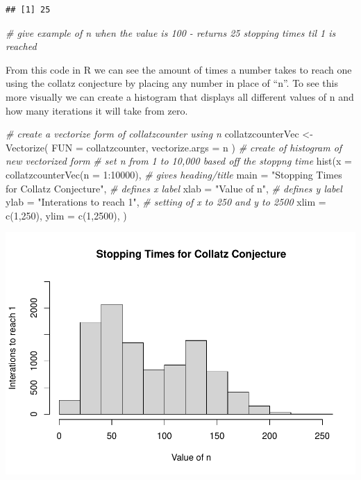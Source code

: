 \documentclass[
]{article}
\newenvironment{Shaded}{\begin{snugshade}}{\end{snugshade}}
\newcommand{\AttributeTok}[1]{\textcolor[rgb]{0.77,0.63,0.00}{#1}}
\newcommand{\CommentTok}[1]{\textcolor[rgb]{0.56,0.35,0.01}{\textit{#1}}}
\newcommand{\DecValTok}[1]{\textcolor[rgb]{0.00,0.00,0.81}{#1}}
\newcommand{\FunctionTok}[1]{\textcolor[rgb]{0.00,0.00,0.00}{#1}}
\newcommand{\NormalTok}[1]{#1}
\newcommand{\OtherTok}[1]{\textcolor[rgb]{0.56,0.35,0.01}{#1}}
\newcommand{\SpecialCharTok}[1]{\textcolor[rgb]{0.00,0.00,0.00}{#1}}
\newcommand{\StringTok}[1]{\textcolor[rgb]{0.31,0.60,0.02}{#1}}
\begin{document}
\begin{verbatim}
## [1] 25
\end{verbatim}

\begin{Shaded}
\begin{Highlighting}[]
\CommentTok{\# give example of n when the value is 100 {-} returns 25 stopping times til 1 is reached }
\end{Highlighting}
\end{Shaded}

From this code in R we can see the amount of times a number takes to
reach one using the collatz conjecture by placing any number in place of
``n''. To see this more visually we can create a histogram that displays
all different values of n and how many iterations it will take from
zero.

\begin{Shaded}
\begin{Highlighting}[]
\CommentTok{\# create a vectorize form of collatzcounter using \textquotesingle{}n\textquotesingle{}}
\NormalTok{collatzcounterVec }\OtherTok{\textless{}{-}} \FunctionTok{Vectorize}\NormalTok{(}
  \AttributeTok{FUN =}\NormalTok{ collatzcounter,}
  \AttributeTok{vectorize.args =} \StringTok{\textquotesingle{}n\textquotesingle{}}
\NormalTok{)}
\CommentTok{\# create of histogram of new vectorized form}
\CommentTok{\# set n from 1 to 10,000 based off the stoppng time}
\FunctionTok{hist}\NormalTok{(}\AttributeTok{x =} \FunctionTok{collatzcounterVec}\NormalTok{(}\AttributeTok{n =} \DecValTok{1}\SpecialCharTok{:}\DecValTok{10000}\NormalTok{),}
     \CommentTok{\# gives heading/title}
    \AttributeTok{main =} \StringTok{"Stopping Times for Collatz Conjecture"}\NormalTok{,}
    \CommentTok{\# defines x label}
    \AttributeTok{xlab =} \StringTok{"Value of n"}\NormalTok{,}
    \CommentTok{\# defines y label}
    \AttributeTok{ylab =} \StringTok{"Interations to reach 1"}\NormalTok{,}
    \CommentTok{\# setting of x to 250 and y to 2500}
    \AttributeTok{xlim =} \FunctionTok{c}\NormalTok{(}\DecValTok{1}\NormalTok{,}\DecValTok{250}\NormalTok{),}
    \AttributeTok{ylim =} \FunctionTok{c}\NormalTok{(}\DecValTok{1}\NormalTok{,}\DecValTok{2500}\NormalTok{),}
\NormalTok{)}
\end{Highlighting}
\end{Shaded}

\includegraphics{Activity-8-_files/figure-latex/Histogram-1.pdf}
\end{document}
